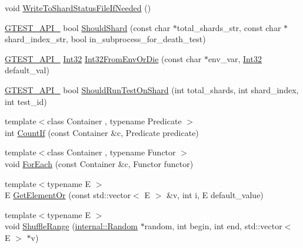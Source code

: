 \begin{DoxyCompactItemize}
\item 
void \hyperlink{namespacetesting_1_1internal_a656c8ec8f2ee82fa90b9ba61b6145538}{\-Write\-To\-Shard\-Status\-File\-If\-Needed} ()
\item 
\hyperlink{gtest-port_8h_aa73be6f0ba4a7456180a94904ce17790}{\-G\-T\-E\-S\-T\-\_\-\-A\-P\-I\-\_\-} bool \hyperlink{namespacetesting_1_1internal_a57e2697262a419061fc4cd3377a9271e}{\-Should\-Shard} (const char $\ast$total\-\_\-shards\-\_\-str, const char $\ast$shard\-\_\-index\-\_\-str, bool in\-\_\-subprocess\-\_\-for\-\_\-death\-\_\-test)
\item 
\hyperlink{gtest-port_8h_aa73be6f0ba4a7456180a94904ce17790}{\-G\-T\-E\-S\-T\-\_\-\-A\-P\-I\-\_\-} \hyperlink{namespacetesting_1_1internal_a8d84339888eecdb29b3d8f7607af3ecc}{\-Int32} \hyperlink{namespacetesting_1_1internal_afec7cf2eb159fa969f88d192ee507d23}{\-Int32\-From\-Env\-Or\-Die} (const char $\ast$env\-\_\-var, \hyperlink{namespacetesting_1_1internal_a8d84339888eecdb29b3d8f7607af3ecc}{\-Int32} default\-\_\-val)
\item 
\hyperlink{gtest-port_8h_aa73be6f0ba4a7456180a94904ce17790}{\-G\-T\-E\-S\-T\-\_\-\-A\-P\-I\-\_\-} bool \hyperlink{namespacetesting_1_1internal_ac05861de55e638fa73ea70a3f2f6f622}{\-Should\-Run\-Test\-On\-Shard} (int total\-\_\-shards, int shard\-\_\-index, int test\-\_\-id)
\item 
{\footnotesize template$<$class Container , typename Predicate $>$ }\\int \hyperlink{namespacetesting_1_1internal_ab37ae76c997078f65ba28f35b3657151}{\-Count\-If} (const \-Container \&c, \-Predicate predicate)
\item 
{\footnotesize template$<$class Container , typename Functor $>$ }\\void \hyperlink{namespacetesting_1_1internal_af699259a2b1e5e06250ed075b735b1f6}{\-For\-Each} (const \-Container \&c, \-Functor functor)
\item 
{\footnotesize template$<$typename E $>$ }\\\-E \hyperlink{namespacetesting_1_1internal_a06b7c21a279eef9fbf0b8810af41e6b5}{\-Get\-Element\-Or} (const std\-::vector$<$ \-E $>$ \&v, int i, \-E default\-\_\-value)
\item 
{\footnotesize template$<$typename E $>$ }\\void \hyperlink{namespacetesting_1_1internal_af0e4357002b5772a92cb960ea611e80c}{\-Shuffle\-Range} (\hyperlink{classtesting_1_1internal_1_1Random}{internal\-::\-Random} $\ast$random, int begin, int end, std\-::vector$<$ \-E $>$ $\ast$v)

\end{DoxyCompactItemize}
